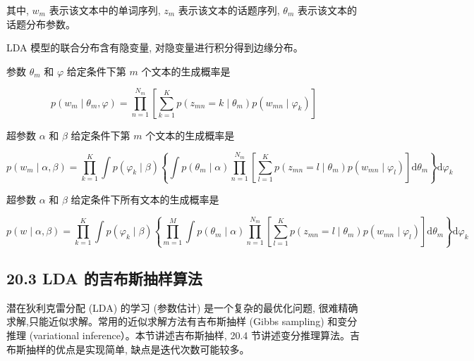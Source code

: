 \documentclass[10pt]{article}
\begin{document}
\begin{CJK*}{UTF8}{bsmi}
其中, $w_{m}$ 表示该文本中的单词序列, $z_{m}$ 表示该文本的话题序列, $\theta_{m}$ 表示该文本的话题分布参数。

LDA 模型的联合分布含有隐变量, 对隐变量进行积分得到边缘分布。

参数 $\theta_{m}$ 和 $\varphi$ 给定条件下第 $m$ 个文本的生成概率是


\begin{equation*}
p\left(w_{m} \mid \theta_{m}, \varphi\right)=\prod_{n=1}^{N_{m}}\left[\sum_{k=1}^{K} p\left(z_{m n}=k \mid \theta_{m}\right) p\left(w_{m n} \mid \varphi_{k}\right)\right] \tag{20.17}
\end{equation*}


超参数 $\alpha$ 和 $\beta$ 给定条件下第 $m$ 个文本的生成概率是


\begin{equation*}
p\left(w_{m} \mid \alpha, \beta\right)=\prod_{k=1}^{K} \int p\left(\varphi_{k} \mid \beta\right)\left\{\int p\left(\theta_{m} \mid \alpha\right) \prod_{n=1}^{N_{m}}\left[\sum_{l=1}^{K} p\left(z_{m n}=l \mid \theta_{m}\right) p\left(w_{m n} \mid \varphi_{l}\right)\right] \mathrm{d} \theta_{m}\right\} \mathrm{d} \varphi_{k} \tag{20.18}
\end{equation*}


超参数 $\alpha$ 和 $\beta$ 给定条件下所有文本的生成概率是


\begin{equation*}
p(w \mid \alpha, \beta)=\prod_{k=1}^{K} \int p\left(\varphi_{k} \mid \beta\right)\left\{\prod_{m=1}^{M} \int p\left(\theta_{m} \mid \alpha\right) \prod_{n=1}^{N_{m}}\left[\sum_{l=1}^{K} p\left(z_{m n}=l \mid \theta_{m}\right) p\left(w_{m n} \mid \varphi_{l}\right)\right] \mathrm{d} \theta_{m}\right\} \mathrm{d} \varphi_{k} \tag{20.19}
\end{equation*}


\subsection*{20.3 LDA 的吉布斯抽样算法}
潜在狄利克雷分配 (LDA) 的学习 (参数估计) 是一个复杂的最优化问题, 很难精确求解,只能近似求解。常用的近似求解方法有吉布斯抽样 (Gibbs sampling) 和变分推理 (variational inference）。本节讲述吉布斯抽样, 20.4 节讲述变分推理算法。吉布斯抽样的优点是实现简单, 缺点是迭代次数可能较多。


\end{CJK*}
\end{document}
